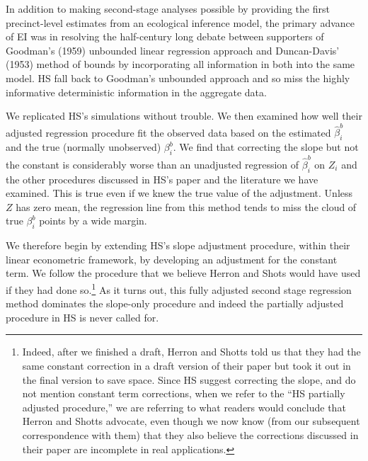 \documentclass[11pt,titlepage]{article}
\begin{document}
In addition to making second-stage analyses possible by providing the
first precinct-level estimates from an ecological inference model, the
primary advance of EI was in resolving the half-century long debate
between supporters of Goodman's (1959) unbounded linear regression
approach and Duncan-Davis' (1953) method of bounds by incorporating
all information in both into the same model.  HS fall back to
Goodman's unbounded approach and so miss the highly informative
deterministic information in the aggregate data.

We replicated HS's simulations without trouble.  We then examined how
well their adjusted regression procedure fit the observed data based
on the estimated $\hat\beta_i^b$ and the true (normally unobserved)
$\beta_i^b$.  We find that correcting the slope but not the constant
is considerably worse than an unadjusted regression of $\hat\beta_i^b$
on $Z_i$ and the other procedures discussed in HS's paper and the
literature we have examined.  This is true even if we knew the true
value of the adjustment.  Unless $Z$ has zero mean, the regression
line from this method tends to miss the cloud of true $\beta_i^b$
points by a wide margin.

We therefore begin by extending HS's slope adjustment procedure,
within their linear econometric framework, by developing an adjustment
for the constant term.  We follow the procedure that we believe Herron
and Shots would have used if they had done so.\footnote{Indeed, after
  we finished a draft, Herron and Shotts told us that they had the
  same constant correction in a draft version of their paper but took
  it out in the final version to save space.  Since HS suggest
  correcting the slope, and do not mention constant term corrections,
  when we refer to the ``HS partially adjusted procedure,'' we are
  referring to what readers would conclude that Herron and Shotts
  advocate, even though we now know (from our subsequent
  correspondence with them) that they also believe the corrections
  discussed in their paper are incomplete in real applications.}  As
it turns out, this fully adjusted second stage regression method
dominates the slope-only procedure and indeed the partially adjusted
procedure in HS is never called for.
\end{document}
